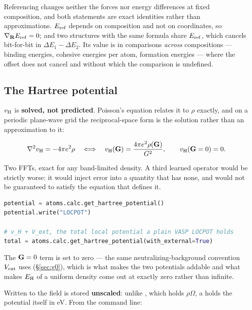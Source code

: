 \begin{pnote}
Referencing changes neither the forces nor energy differences at fixed
composition, and both statements are exact identities rather than
approximations. $E_{\rm ref}$ depends on composition and not on coordinates, so
$\nabla_{\mathbf{R}} E_{\rm ref} = 0$; and two structures with the same formula share
$E_{\rm ref}$, which cancels bit-for-bit in $\Delta E_1 - \Delta E_2$. Its
value is in comparisons \emph{across} compositions --- binding energies,
cohesive energies per atom, formation energies --- where the offset does not
cancel and without which the comparison is undefined.
\end{pnote}

\subsection{The Hartree potential}
\label{sec:hartree-field}

$v_{\mathrm{H}}$ is \textbf{solved, not predicted}. Poisson's equation relates it to
$\rho$ exactly, and on a periodic plane-wave grid the reciprocal-space form is
the solution rather than an approximation to it:

\begin{equation*}
\nabla^2 v_{\mathrm{H}} = -4\pi e^2\rho
\quad\Longleftrightarrow\quad
v_{\mathrm{H}}(\mathbf{G}) = \frac{4\pi e^2\rho(\mathbf{G})}{G^2},
\qquad v_{\mathrm{H}}(\mathbf{G} = 0) = 0 .
\end{equation*}

Two FFTs, exact for any band-limited density. A third learned operator would be
strictly worse: it would inject error into a quantity that has none, and would
not be guaranteed to satisfy the equation that defines it.

\begin{lstlisting}[language=Python]
potential = atoms.calc.get_hartree_potential()
potential.write("LOCPOT")

# v_H + V_ext, the total local potential a plain VASP LOCPOT holds
total = atoms.calc.get_hartree_potential(with_external=True)
\end{lstlisting}

The $\mathbf{G} = 0$ term is set to zero --- the same neutralizing-background
convention $V_{\mathrm{ext}}$ uses (\S\ref{sec:g0}), which is what makes the two
potentials addable and what makes $E_{\rm H}$ of a uniform density come out at
exactly zero rather than infinite.

Written to  the field is stored \textbf{unscaled}: unlike
, which holds $\rho\Omega$, a  holds the potential
itself in eV. From the command line:

